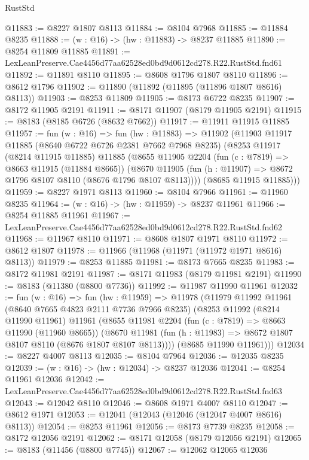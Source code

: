 \begin{lexlean}{RustStd}
\begin{coremodule}
@11883 := @8227 @1807 @8113
@11884 := @8104 @7968
@11885 := @11884 @8235
@11888 := (w : @16) -> (hw : @11883) -> @8237 @11885
@11890 := @8254 @11809 @11885
@11891 := LexLeanPreserve.Cae4456d77aa62528ed0bd9d0612cd278.R22.RustStd.fnd61
@11892 := @11891 @8110
@11895 := @8608 @1796 @1807 @8110
@11896 := @8612 @1796
@11902 := @11890 (@11892 (@11895 (@11896 @1807 @8616) @8113))
@11903 := @8253 @11809
@11905 := @8173 @6722 @8235
@11907 := @8172 @11905 @2191
@11911 := @8171 @11907 (@8179 @11905 @2191)
@11915 := @8183 (@8185 @6726 (@8632 @7662))
@11917 := @11911 @11915 @11885
@11957 := fun (w : @16) =>
  fun (hw : @11883) =>
  @11902
    (@11903
      @11917
      @11885
      (@8640 @6722 @6726 @2381 @7662 @7968 @8235)
      (@8253
        @11917
        (@8214 @11915 @11885)
        @11885
        (@8655
          @11905
          @2204
          (fun (c : @7819) => @8663 @11915 (@11884 @8665))
          (@8670 @11905 (fun (h : @11907) => @8672 @1796 @8107 @8110 (@8676 @1796 @8107 @8113))))
        (@8685 @11915 @11885)))
@11959 := @8227 @1971 @8113
@11960 := @8104 @7966
@11961 := @11960 @8235
@11964 := (w : @16) -> (hw : @11959) -> @8237 @11961
@11966 := @8254 @11885 @11961
@11967 := LexLeanPreserve.Cae4456d77aa62528ed0bd9d0612cd278.R22.RustStd.fnd62
@11968 := @11967 @8110
@11971 := @8608 @1807 @1971 @8110
@11972 := @8612 @1807
@11978 := @11966 (@11968 (@11971 (@11972 @1971 @8616) @8113))
@11979 := @8253 @11885
@11981 := @8173 @7665 @8235
@11983 := @8172 @11981 @2191
@11987 := @8171 @11983 (@8179 @11981 @2191)
@11990 := @8183 (@11380 (@8800 @7736))
@11992 := @11987 @11990 @11961
@12032 := fun (w : @16) =>
  fun (hw : @11959) =>
  @11978
    (@11979
      @11992
      @11961
      (@8640 @7665 @4823 @2111 @7736 @7966 @8235)
      (@8253
        @11992
        (@8214 @11990 @11961)
        @11961
        (@8655
          @11981
          @2204
          (fun (c : @7819) => @8663 @11990 (@11960 @8665))
          (@8670 @11981 (fun (h : @11983) => @8672 @1807 @8107 @8110 (@8676 @1807 @8107 @8113))))
        (@8685 @11990 @11961)))
@12034 := @8227 @4007 @8113
@12035 := @8104 @7964
@12036 := @12035 @8235
@12039 := (w : @16) -> (hw : @12034) -> @8237 @12036
@12041 := @8254 @11961 @12036
@12042 := LexLeanPreserve.Cae4456d77aa62528ed0bd9d0612cd278.R22.RustStd.fnd63
@12043 := @12042 @8110
@12046 := @8608 @1971 @4007 @8110
@12047 := @8612 @1971
@12053 := @12041 (@12043 (@12046 (@12047 @4007 @8616) @8113))
@12054 := @8253 @11961
@12056 := @8173 @7739 @8235
@12058 := @8172 @12056 @2191
@12062 := @8171 @12058 (@8179 @12056 @2191)
@12065 := @8183 (@11456 (@8800 @7745))
@12067 := @12062 @12065 @12036

\end{coremodule}
\end{lexlean}
